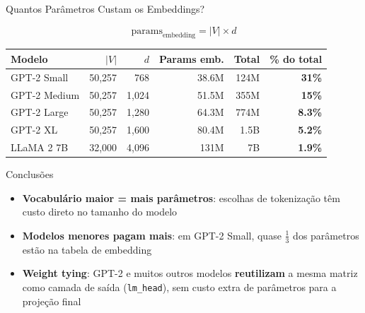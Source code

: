 \documentclass[aspectratio=169,xcolor=dvipsnames]{beamer}
\begin{document}

\begin{frame}[shrink=15]{Quantos Parâmetros Custam os Embeddings?}

\[
  \text{params}_{\text{embedding}} = |V| \times d
\]

\vspace{6pt}

\begin{center}
\small
\renewcommand{\arraystretch}{1.2}
\begin{tabular}{lrrrrr}
\toprule
\textbf{Modelo} & $|V|$ & $d$ & \textbf{Params emb.} & \textbf{Total} & \textbf{\% do total} \\
\midrule
GPT-2 Small  & 50,257 & 768   & 38.6M & 124M  & \textbf{31\%} \\
GPT-2 Medium & 50,257 & 1,024 & 51.5M & 355M  & \textbf{15\%} \\
GPT-2 Large  & 50,257 & 1,280 & 64.3M & 774M  & \textbf{8.3\%} \\
GPT-2 XL     & 50,257 & 1,600 & 80.4M & 1.5B & \textbf{5.2\%} \\
LLaMA 2 7B   & 32,000 & 4,096 & 131M    & 7B    & \textbf{1.9\%} \\
\bottomrule
\end{tabular}
\end{center}

\vspace{6pt}

\begin{alertblock}{Conclusões}
\begin{itemize}
    \item \textbf{Vocabulário maior = mais parâmetros}: escolhas de tokenização têm custo direto no tamanho do modelo
    \item \textbf{Modelos menores pagam mais}: em GPT-2 Small, quase $\frac{1}{3}$ dos parâmetros estão na tabela de embedding
    \item \textbf{Weight tying}: GPT-2 e muitos outros modelos \textbf{reutilizam} a mesma matriz como camada de saída (\texttt{lm\_head}), sem custo extra de parâmetros para a projeção final
\end{itemize}
\end{alertblock}

\end{frame}

\end{document}
